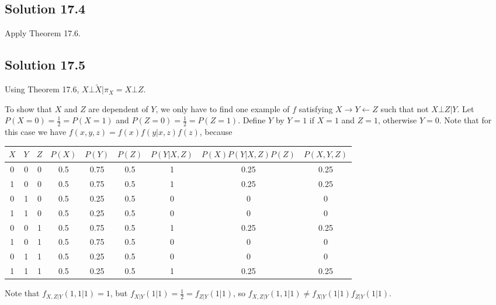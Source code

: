 \subsection*{Solution 17.4}

Apply Theorem 17.6.


\subsection*{Solution 17.5}

Using Theorem 17.6, $X \bot \tilde{X} | \pi_X = X \bot Z$.

To show that $X$ and $Z$ are dependent of $Y$, we only have to find one example of $f$ satisfying $X \rightarrow Y \leftarrow Z$ such that not $X \bot Z | Y$.
Let $P(X = 0) = \frac{1}{2} = P(X = 1)$ and $P(Z = 0) = \frac{1}{2} = P(Z = 1)$.
Define $Y$ by $Y = 1$ if $X = 1$ and $Z = 1$, otherwise $Y = 0$.
Note that for this case we have $f(x, y, z) = f(x) f(y|x,z) f(z)$, because
\begin{table}[H]
    \begin{tabular}{c|c|c||c|c|c|c|c|c}
        $X$ & $Y$ & $Z$ & $P(X)$ & $P(Y)$ &  $P(Z)$ & $P(Y|X,Z)$ & $P(X)P(Y|X,Z)P(Z)$ & $P(X,Y,Z)$ \\ \hline \hline
        0   & 0   & 0   & 0.5    & 0.75   &  0.5    & 1          & 0.25               & 0.25       \\ \hline
        1   & 0   & 0   & 0.5    & 0.75   &  0.5    & 1          & 0.25               & 0.25       \\ \hline
        0   & 1   & 0   & 0.5    & 0.25   &  0.5    & 0          & 0                  & 0          \\ \hline
        1   & 1   & 0   & 0.5    & 0.25   &  0.5    & 0          & 0                  & 0          \\ \hline
        0   & 0   & 1   & 0.5    & 0.75   &  0.5    & 1          & 0.25               & 0.25       \\ \hline
        1   & 0   & 1   & 0.5    & 0.75   &  0.5    & 0          & 0                  & 0          \\ \hline
        0   & 1   & 1   & 0.5    & 0.25   &  0.5    & 0          & 0                  & 0          \\ \hline
        1   & 1   & 1   & 0.5    & 0.25   &  0.5    & 1          & 0.25               & 0.25
    \end{tabular}
\end{table}
Note that $f_{X,Z|Y}(1, 1| 1) = 1$, but $f_{X|Y}(1|1) = \frac{1}{2} = f_{Z|Y}(1|1)$, so $f_{X,Z|Y}(1,1|1) \neq f_{X|Y}(1|1)f_{Z|Y}(1|1)$.


